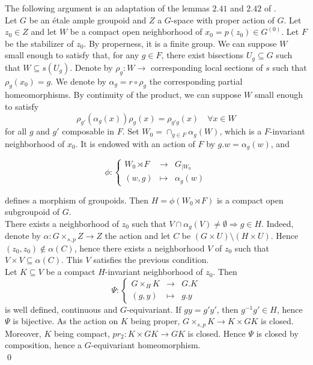 \begin{dem} The following argument is an adaptation of the lemmas $2.41$ and $2.42$ of \cite{TuNonHaus}.\\%

Let $G$ be an étale ample groupoid and $Z$ a $G$-space with proper action of $G$. Let $z_0\in Z$ and let $W$ be a compact open neighborhood of $x_0=p(z_0)\in G^{(0)}$. Let $F$ be the stabilizer of $z_0$. By properness, it is a finite group. We can suppose $W$ small enough to satisfy that, for any $g\in F$, there exist bisections $U_g \subseteq G$ such that $W \subseteq s(U_g)$. Denote by $\rho_g : W\rightarrow$ corresponding local sections of $s$ such that $\rho_g(x_0)=g$. We denote by $\alpha_g =r\circ \rho_g$ the corresponding partial homeomorphisms. By continuity of the product, we can suppose $W$ small enough to satisfy 
\[\rho_{g'}(\alpha_g(x))\rho_g(x) = \rho_{g'g}(x) \quad\forall x\in W\]
for all $g$ and $g'$ composable in $F$. Set $W_0 = \cap_{g\in F}\alpha_g(W)$, which is a $F$-invariant neighborhood of $x_0$. It is endowed with an action of $F$ by $g.w=\alpha_g(w)$, and 

\[\phi : \left\{ \begin{array}{rcl}
W_0\rtimes F & \rightarrow & G_{|W_0} \\ 
(w,g) & \mapsto & \alpha_g(w) \end{array}\right.\] 

defines a morphism of groupoids. Then $H= \phi(W_0\rtimes F)$ is a compact open subgroupoid of $G$.\\

There exists a neighborhood of $z_0$ such that $V\cap \alpha_g(V) \neq \emptyset \Rightarrow g\in H$. Indeed, denote by $\alpha : G\times_{s,p} Z\rightarrow Z$ the action and let $C$ be  $(G\times U) \setminus (H\times U)$. Hence $(z_0,z_0)\notin \alpha(C)$, hence there exists a neighborhood $V$ of $z_0$ such that $V\times V \subseteq \alpha(C)$. This $V$ satisfies the previous condition. \\

Let $K\subseteq V$ be a compact $H$-invariant neighborhood of $z_0$. Then   
\[\Psi : \left\{ \begin{array}{rcl}
G\times_H K & \rightarrow & G.K \\ 
(g,y) & \mapsto & g.y \end{array}\right.\]
is well defined, continuous and $G$-equivariant. If $gy =g'y' $, then $g^{-1}g'\in H$, hence $\Psi$ is bijective. As the action on $K$ being proper, $G\times_{s,p} K \rightarrow K\times GK$ is closed. Moreover, $K$ being compact, $pr_2 : K\times GK \rightarrow GK$ is closed. Hence $\Psi$ is closed by composition, hence a $G$-equivariant homeomorphism. \\
\qed
\end{dem}

